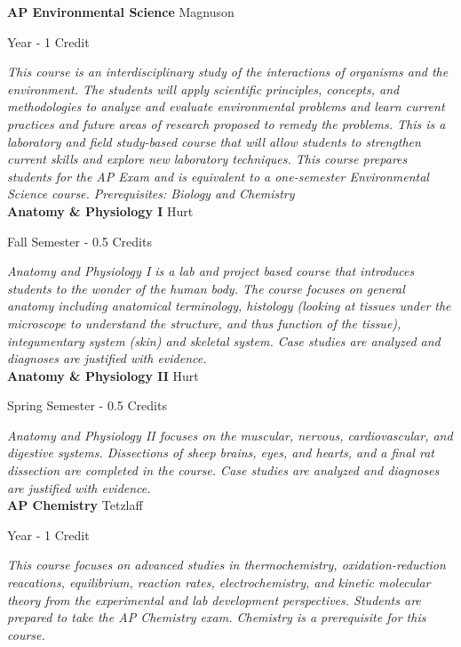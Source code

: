 \noindent\textbf{AP Environmental Science} \hfill Magnuson

\noindent Year - 1 Credit

\vspace{1mm}\emph{This course is an interdisciplinary study of the interactions of organisms and the environment. The students will apply scientific principles, concepts, and methodologies to analyze and evaluate environmental problems and learn current practices and future areas of research proposed to remedy the problems. This is a laboratory and field study-based course that will allow students to strengthen current skills and explore new laboratory techniques.  This course prepares students for the AP Exam and is equivalent to a one-semester Environmental Science course. Prerequisites: Biology and Chemistry}\\


\noindent\textbf{Anatomy \& Physiology I} \hfill Hurt

\noindent Fall Semester - 0.5 Credits

\vspace{1mm}\emph{Anatomy and Physiology I is a lab and project based course that introduces students to the wonder of the human body. The course focuses on general anatomy including anatomical terminology, histology (looking at tissues under the microscope to understand the structure, and thus function of the tissue), integumentary system (skin) and skeletal system. Case studies are analyzed and diagnoses are justified with evidence.}\\


\noindent\textbf{Anatomy \& Physiology II} \hfill Hurt

\noindent Spring Semester - 0.5 Credits

\vspace{1mm}\emph{Anatomy and Physiology II focuses on the muscular, nervous, cardiovascular, and digestive systems. Dissections of sheep brains, eyes, and hearts, and a final rat dissection are completed in the course. Case studies are analyzed and diagnoses are justified with evidence.}\\


\noindent\textbf{AP Chemistry} \hfill Tetzlaff

\noindent Year - 1 Credit

\vspace{1mm}\emph{This course focuses on advanced studies in thermochemistry, oxidation-reduction reacations, equilibrium, reaction rates, electrochemistry, and kinetic molecular theory from the experimental and lab development perspectives. Students are prepared to take the AP Chemistry exam. Chemistry is a prerequisite for this course.}\\


